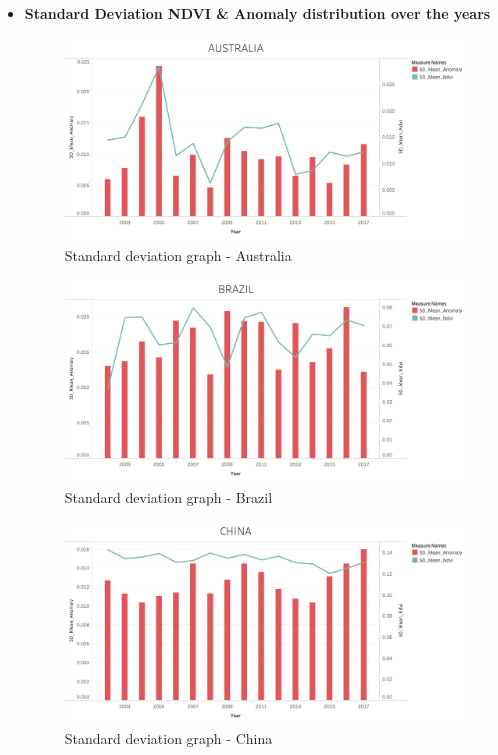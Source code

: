 \begin{itemize}
    \item \textbf{Standard Deviation NDVI \& Anomaly distribution over the years}
    
    \begin{figure}[H]
            \centering
            \includegraphics[width=1.0\linewidth]{figures/ch5/StandardDeviation/AUSTRALIA_SD.png}
            \caption{Standard deviation graph - Australia}\label{Fig:AUSTRALIA_SD}
    \end{figure}
    
    \begin{figure}[H]
            \centering
             \includegraphics[width=1.0\linewidth]{figures/ch5/StandardDeviation/BRAZIL_SD.png}
            \caption{Standard deviation graph - Brazil}\label{Fig:BRAZIL_SD}
    \end{figure}
    
    \begin{figure}[H]
            \centering
            \includegraphics[width=1.0\linewidth]{figures/ch5/StandardDeviation/CHINA_SD.png}
            \caption{Standard deviation graph - China}\label{Fig:CHINA_SD}
    \end{figure}
    

\end{itemize}
